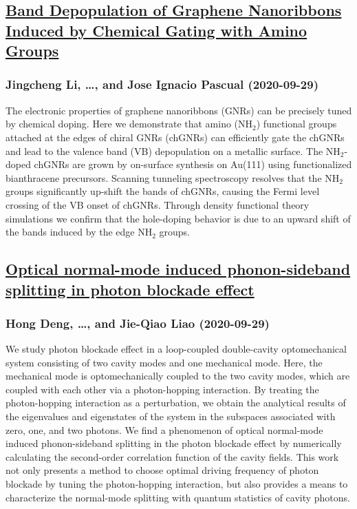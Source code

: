 \subsection*{\href{http://arxiv.org/abs/2009.13936v1}{Band Depopulation of Graphene Nanoribbons Induced by Chemical Gating  with Amino Groups}}
\subsubsection*{Jingcheng Li, \dots, and Jose Ignacio Pascual (2020-09-29)}
The electronic properties of graphene nanoribbons (GNRs) can be precisely
tuned by chemical doping. Here we demonstrate that amino (NH$_2$) functional
groups attached at the edges of chiral GNRs (chGNRs) can efficiently gate the
chGNRs and lead to the valence band (VB) depopulation on a metallic surface.
The NH$_2$-doped chGNRs are grown by on-surface synthesis on Au(111) using
functionalized bianthracene precursors. Scanning tunneling spectroscopy
resolves that the NH$_2$ groups significantly up-shift the bands of chGNRs,
causing the Fermi level crossing of the VB onset of chGNRs. Through density
functional theory simulations we confirm that the hole-doping behavior is due
to an upward shift of the bands induced by the edge NH$_2$ groups.

\subsection*{\href{http://arxiv.org/abs/2009.13933v1}{Optical normal-mode induced phonon-sideband splitting in photon blockade  effect}}
\subsubsection*{Hong Deng, \dots, and Jie-Qiao Liao (2020-09-29)}
We study photon blockade effect in a loop-coupled double-cavity
optomechanical system consisting of two cavity modes and one mechanical mode.
Here, the mechanical mode is optomechanically coupled to the two cavity modes,
which are coupled with each other via a photon-hopping interaction. By treating
the photon-hopping interaction as a perturbation, we obtain the analytical
results of the eigenvalues and eigenstates of the system in the subspaces
associated with zero, one, and two photons. We find a phenomenon of optical
normal-mode induced phonon-sideband splitting in the photon blockade effect by
numerically calculating the second-order correlation function of the cavity
fields. This work not only presents a method to choose optimal driving
frequency of photon blockade by tuning the photon-hopping interaction, but also
provides a means to characterize the normal-mode splitting with quantum
statistics of cavity photons.

